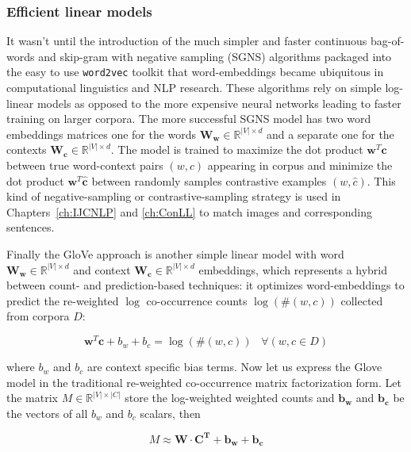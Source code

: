 \subsubsection{Efficient linear models}
\label{sec:w2v}
It wasn't until the introduction of the much simpler and faster continuous bag-of-words
and skip-gram with negative sampling (SGNS) algorithms \cite{mikolov2013efficient}
packaged into the easy to use \texttt{word2vec} toolkit that
word-embeddings became ubiquitous in computational linguistics and NLP research.
These algorithms rely on simple log-linear models as opposed to the more expensive
neural networks leading to faster training on larger corpora. The more successful SGNS
model has two word embeddings matrices one for the words
$\mathbf{W_w}  \in \mathbb{R}^{|V| \times d}$
and a separate one for the contexts $\mathbf{W_c} \in \mathbb{R}^{|V| \times d}$.
The model is trained to maximize the dot product $\mathbf{w}^T\mathbf{c}$
between true word-context pairs $(w,c)$ appearing in corpus and minimize the
dot product $\mathbf{w}^T\mathbf{\hat{c}}$ between randomly
samples contrastive examples $(w,\hat{c})$. This kind of negative-sampling or
contrastive-sampling strategy is used in Chapters~\ref{ch:IJCNLP} and \ref{ch:ConLL} to
match images and corresponding sentences.

Finally the GloVe approach \citep{pennington2014glove} is another simple linear model
with word $\mathbf{W_w}  \in \mathbb{R}^{|V| \times d}$ and context
$\mathbf{W_c} \in \mathbb{R}^{|V| \times d}$ embeddings, which
represents a hybrid between count- and prediction-based techniques:
it optimizes word-embeddings to predict the re-weighted
$\log$ co-occurrence counts $\log(\#(w,c))$ collected from corpora $D$:

\begin{equation}
\label{eq:glove}
\mathbf{w}^T\mathbf{c} + b_w + b_c = \log(\#(w,c))\;\;\; \forall (w,c \in D)
\end{equation}

where $b_w$ and $b_c$ are context specific bias terms.
Now let us express the Glove model in the traditional re-weighted
co-occurrence matrix factorization form.
Let the matrix $M \in \mathbb{R}^{|V| \times |C|}$ store the log-weighted
weighted counts and $\mathbf{b_w}$ and $\mathbf{b_c}$ be the vectors of all
$b_w$ and $b_c$ scalars, then

\begin{equation}
\label{eq:glove2}
M \approx \mathbf{W} \cdot \mathbf{C^T} + \mathbf{b_w} + \mathbf{b_c}
\end{equation}

